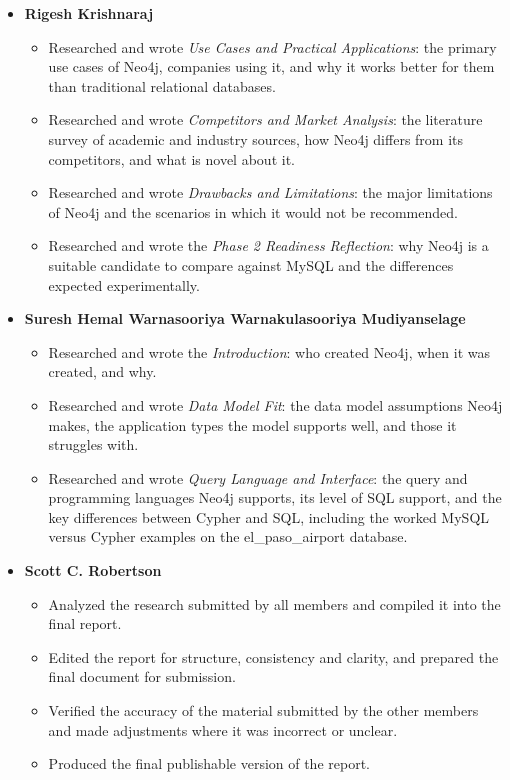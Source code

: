 \documentclass[10pt,a4paper,twocolumn]{article}
\begin{document}
\begin{itemize}
  \item \textbf{Rigesh Krishnaraj}
    \begin{itemize}
      \item Researched and wrote \textit{Use Cases and Practical Applications}: the primary use cases of Neo4j, companies using it, and why it works better for them than traditional relational databases.
      \item Researched and wrote \textit{Competitors and Market Analysis}: the literature survey of academic and industry sources, how Neo4j differs from its competitors, and what is novel about it.
      \item Researched and wrote \textit{Drawbacks and Limitations}: the major limitations of Neo4j and the scenarios in which it would not be recommended.
      \item Researched and wrote the \textit{Phase 2 Readiness Reflection}: why Neo4j is a suitable candidate to compare against MySQL and the differences expected experimentally.
    \end{itemize}
  \item \textbf{Suresh Hemal Warnasooriya Warnakulasooriya Mudiyanselage}
    \begin{itemize}
      \item Researched and wrote the \textit{Introduction}: who created Neo4j, when it was created, and why.
      \item Researched and wrote \textit{Data Model Fit}: the data model assumptions Neo4j makes, the application types the model supports well, and those it struggles with.
      \item Researched and wrote \textit{Query Language and Interface}: the query and programming languages Neo4j supports, its level of SQL support, and the key differences between Cypher and SQL, including the worked MySQL versus Cypher examples on the el\_paso\_airport database.
    \end{itemize}
  \item \textbf{Scott C. Robertson}
    \begin{itemize}
      \item Analyzed the research submitted by all members and compiled it into the final report.
      \item Edited the report for structure, consistency and clarity, and prepared the final document for submission.
      \item Verified the accuracy of the material submitted by the other members and made adjustments where it was incorrect or unclear.
      \item Produced the final publishable version of the report.
    \end{itemize}
\end{itemize}

\clearpage
{}


\end{document}
